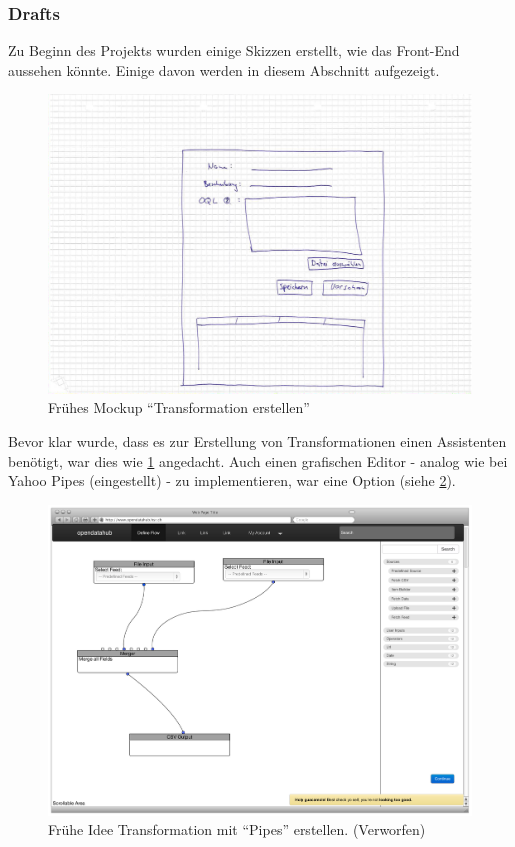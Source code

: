 \subsubsection{Drafts}
Zu Beginn des Projekts wurden einige Skizzen erstellt, wie das Front-End aussehen könnte. Einige davon werden in diesem Abschnitt aufgezeigt.
\begin{figure}[H]
    \centering    
    \includegraphics[width=0.8\linewidth]{fig/mockup_hcdi}
    \caption{Frühes Mockup ``Transformation erstellen''}
    \label{fig:pd:mockup-upload}
\end{figure}

Bevor klar wurde, dass es zur Erstellung von Transformationen einen Assistenten benötigt, war dies wie \cref{fig:pd:mockup-upload} angedacht. Auch einen grafischen Editor - analog wie bei Yahoo Pipes (eingestellt) - zu implementieren, war eine Option (siehe \cref{fig:pd:connectors}).

\begin{figure}[H]
    \centering
    \includegraphics[width=0.8\linewidth]{fig/Wireframes-Connectors}
    \caption{Frühe Idee Transformation mit ``Pipes'' erstellen. (Verworfen)}
    \label{fig:pd:connectors}
\end{figure}

